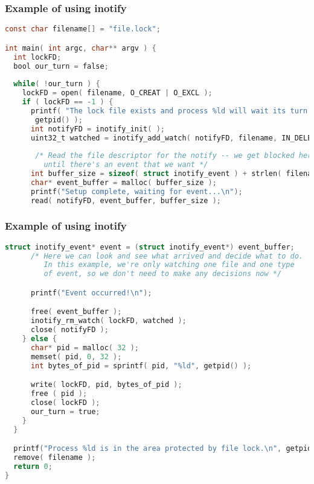 \begin{frame}[fragile]
	\frametitle{Example of using inotify}

	\begin{lstlisting}[language=C]
const char filename[] = "file.lock";

int main( int argc, char** argv ) {
  int lockFD;
  bool our_turn = false;
  
  while( !our_turn ) {
    lockFD = open( filename, O_CREAT | O_EXCL );
    if ( lockFD == -1 ) {
      printf( "The lock file exists and process %ld will wait its turn...\n",
       getpid() ); 
      int notifyFD = inotify_init( );
      uint32_t watched = inotify_add_watch( notifyFD, filename, IN_DELETE_SELF );
      
       /* Read the file descriptor for the notify -- we get blocked here
         until there's an event that we want */
      int buffer_size = sizeof( struct inotify_event ) + strlen( filename ) + 1;
      char* event_buffer = malloc( buffer_size );
      printf("Setup complete, waiting for event...\n");
      read( notifyFD, event_buffer, buffer_size );

\end{lstlisting}
\end{frame}


\begin{frame}[fragile]
	\frametitle{Example of using inotify}

	\begin{lstlisting}[language=C]     
      struct inotify_event* event = (struct inotify_event*) event_buffer;
      /* Here we can look and see what arrived and decide what to do.
         In this example, we're only watching one file and one type
         of event, so we don't need to make any decisions now */

      printf("Event occurred!\n");

      free( event_buffer );
      inotify_rm_watch( lockFD, watched );
      close( notifyFD );
    } else {
      char* pid = malloc( 32 );
      memset( pid, 0, 32 );
      int bytes_of_pid = sprintf( pid, "%ld", getpid() );

      write( lockFD, pid, bytes_of_pid ); 
      free ( pid );
      close( lockFD );
      our_turn = true; 
    }
  } 

  printf("Process %ld is in the area protected by file lock.\n", getpid());
  remove( filename );
  return 0;
}
\end{lstlisting}

\end{frame}


